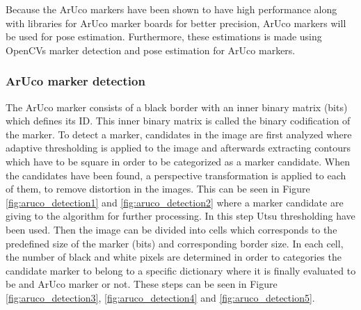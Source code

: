 \documentclass[../Head/report.tex]{subfiles}
\begin{document}
Because the ArUco markers have been shown to have high performance along with libraries for ArUco marker boards for better precision, ArUco markers will be used for pose estimation.       Furthermore, these estimations is made using OpenCVs marker detection and pose estimation for ArUco markers.

\subsubsection{ArUco marker detection}

The ArUco marker consists of a black border with an inner binary matrix (bits) which defines its ID. This inner binary matrix is called the binary codification of the marker. To detect a marker, candidates in the image are first analyzed where adaptive thresholding is applied to the image and afterwards extracting contours which have to be square in order to be categorized as a marker candidate. When the candidates have been found, a perspective transformation is applied to each of them, to remove distortion in the images. This can be seen in Figure \ref{fig:aruco_detection1} and \ref{fig:aruco_detection2} where a marker candidate are giving to the algorithm for further processing. In this step Utsu thresholding have been used. Then the image can be divided into cells which corresponds to the predefined size of the marker (bits) and corresponding border size. In each cell, the number of black and white pixels are determined in order to categories the candidate marker to belong to a specific dictionary where it is finally evaluated to be and ArUco marker or not. These steps can be seen in Figure \ref{fig:aruco_detection3}, \ref{fig:aruco_detection4} and \ref{fig:aruco_detection5}.       
\end{document}
